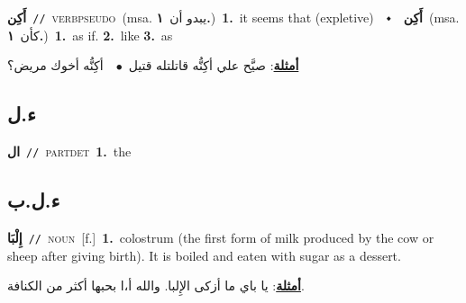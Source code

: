 \documentclass[10pt,a4paper,twoside]{article} %
\begin{document}
\begin{multicols}{2}
{\setlength\topsep{0pt}\textbf{\foreignlanguage{arabic}{أَكِن}}\ {\color{gray}\texttt{//}\color{black}}\ \textsc{verb\textunderscore pseudo}\ \color{gray}(msa. \foreignlanguage{arabic}{يبدو أن}~\foreignlanguage{arabic}{\textbf{١.}})\color{black}\ \textbf{1.}~it seems that (expletive)\ \ $\smblkdiamond$\ \ \setlength\topsep{0pt}\textbf{\foreignlanguage{arabic}{أَكِن}}\ \color{gray}(msa. \foreignlanguage{arabic}{كأن}~\foreignlanguage{arabic}{\textbf{١.}})\color{black}\ \textbf{1.}~as if.  \textbf{2.}~like  \textbf{3.}~as\  \begin{flushright}\color{gray}\foreignlanguage{arabic}{\textbf{\underline{\foreignlanguage{arabic}{أمثلة}}}: صيَّح علي أكِنُّه قاتلتله قتيل\ $\bullet$\ \  أكِنُّه أخوك مريض؟}\end{flushright}\color{black}} \vspace{2mm}

\vspace{-3mm}
\subsection*{\color{blue}\foreignlanguage{arabic}{ء.ل}\color{blue}{ (ntws)}} 

{\setlength\topsep{0pt}\textbf{\foreignlanguage{arabic}{ال}}\ {\color{gray}\texttt{//}\color{black}}\ \textsc{part\textunderscore det}\ \textbf{1.}~the\ } \vspace{2mm}

\vspace{-3mm}
\subsection*{\color{blue}\foreignlanguage{arabic}{ء.ل.ب}\color{blue}{ (ntws)}} 

{\setlength\topsep{0pt}\textbf{\foreignlanguage{arabic}{إِلْبَا}}\ {\color{gray}\texttt{//}\color{black}}\ \textsc{noun}\ [f.]\ \textbf{1.}~colostrum (the first form of milk produced by the cow or sheep after giving birth). It is boiled and eaten with sugar as a dessert.\  \begin{flushright}\color{gray}\foreignlanguage{arabic}{\textbf{\underline{\foreignlanguage{arabic}{أمثلة}}}: يا باي ما أزكى الإِلبا. والله أ،ا بحبها أكثر من الكنافة.}\end{flushright}\color{black}} \vspace{2mm}


\end{multicols}
\end{document}
